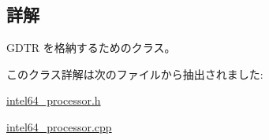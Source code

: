\subsection{詳解}
G\+D\+T\+R を格納するためのクラス。 

このクラス詳解は次のファイルから抽出されました\+:\begin{DoxyCompactItemize}
\item 
\hyperlink{intel64__processor_8h}{intel64\+\_\+processor.\+h}\item 
\hyperlink{intel64__processor_8cpp}{intel64\+\_\+processor.\+cpp}\end{DoxyCompactItemize}

